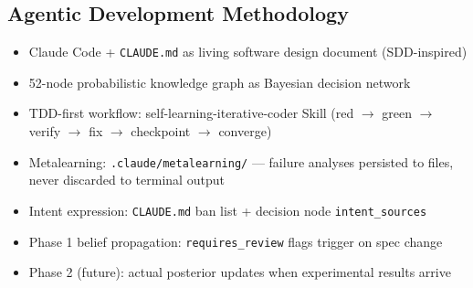 
\subsection{Agentic Development Methodology}
\begin{itemize}
  \item Claude Code + \texttt{CLAUDE.md} as living software design document (SDD-inspired)
  \item 52-node probabilistic knowledge graph as Bayesian decision network
  \item TDD-first workflow: self-learning-iterative-coder Skill
        (red $\to$ green $\to$ verify $\to$ fix $\to$ checkpoint $\to$ converge)
  \item Metalearning: \texttt{.claude/metalearning/} --- failure analyses persisted to files,
        never discarded to terminal output
  \item Intent expression: \texttt{CLAUDE.md} ban list + decision node \texttt{intent\_sources}
  \item Phase 1 belief propagation: \texttt{requires\_review} flags trigger on spec change
  \item Phase 2 (future): actual posterior updates when experimental results arrive
\end{itemize}


